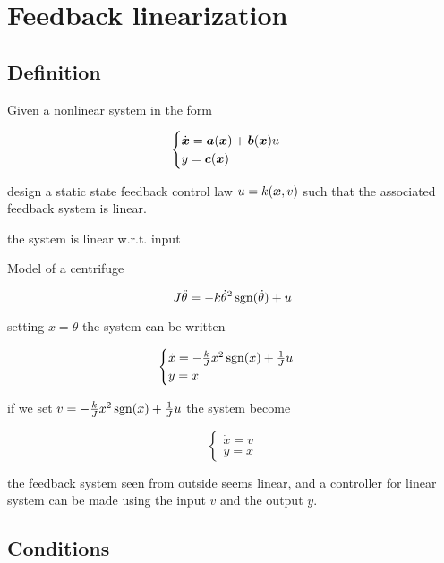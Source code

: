 \chapter{Feedback linearization}

\section{Definition}

Given a nonlinear system in the form

\[
    \begin{cases}
        \dot{\boldsymbol{x}} =\boldsymbol{a}(\boldsymbol{x}) + \boldsymbol{b}(\boldsymbol{x}) u \\
        y = \boldsymbol{c}(\boldsymbol{x})
    \end{cases}
\]

design a static state feedback control law $u = k(\boldsymbol{x},v)$ such that the associated feedback system is linear.

\begin{nb} the system is linear w.r.t. input \end{nb}

\begin{example}
    Model of a centrifuge

    \[
        J \ddot\theta = -k \dot \theta^2 \operatorname{sgn}(\dot \theta) + u
    \]

    setting $x = \dot\theta$ the system can be written

    \[
    \begin{cases}
        \dot x = - \frac{k}{J} x^2 \operatorname{sgn}(x) + \frac{1}{J} u \\
        y = x
    \end{cases}
    \]

    if we set $v = - \frac{k}{J}x^2 \operatorname{sgn}(x) + \frac{1}{J}u$ the system become

    \[
    \begin{cases}
        \dot x = v \\
        y = x
    \end{cases}
    \]

    the feedback system seen from outside seems linear, and a controller for linear system can be made using the input $v$ and the output $y$.
\end{example}



\section{Conditions}

